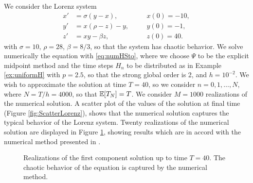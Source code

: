 \documentclass{scrartcl}
\begin{document}
We consider the Lorenz system 
\begin{equation}\label{eq:Lorenz}
\begin{aligned}
x' &= \sigma(y - x), \quad &&x(0) = -10,\\
y' &= x(\rho - z) - y, \quad &&y(0) = -1,\\
z' &= xy - \beta z, \quad &&z(0) = 40.
\end{aligned}
\end{equation}
with $\sigma = 10$, $\rho = 28$, $\beta = 8/3$, so that the system has chaotic behavior. We solve numerically the equation with \eqref{eq:numHSto}, where we choose $\Psi$ to be the explicit midpoint method and the time steps $H_n$ to be distributed as in Example \ref{ex:uniformH} with $p = 2.5$, so that the strong global order is 2, and $h = 10^{-2}$. We wish to approximate the solution at time $T = 40$, so we consider $n = 0, 1, \ldots, N$, where $N = T / h = 4000$, so that $\mathbb{E}[T_N] = T$. We consider $M = 1000$ realizations of the numerical solution. A scatter plot of the values of the solution at final time (Figure \ref{fig:ScatterLorenz}), shows that the numerical solution captures the typical behavior of the Lorenz system. Twenty realizations of the numerical solution are displayed in Figure \ref{fig:SolutionLorenz}, showing results which are in accord with the numerical method presented in \cite{CGS16}.


\begin{figure}[t]
	\centering
	\resizebox{1.0\linewidth}{!}{}
	\caption{Realizations of the first component solution up to time $T=40$. The chaotic behavior of the equation is captured by the numerical method.}
	\label{fig:SolutionLorenz}
\end{figure}



\end{document}
